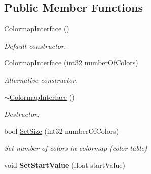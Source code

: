 \subsection*{Public Member Functions}
\begin{DoxyCompactItemize}
\item 
\hypertarget{classColormapInterface_a88621931bd86e21b18c9fb8901e52de2}{
\hyperlink{classColormapInterface_a88621931bd86e21b18c9fb8901e52de2}{ColormapInterface} ()}
\label{classColormapInterface_a88621931bd86e21b18c9fb8901e52de2}

\begin{DoxyCompactList}\small\item\em Default constructor. \end{DoxyCompactList}\item 
\hypertarget{classColormapInterface_abbaf26c369c77b8ce2f34e5f6e23e448}{
\hyperlink{classColormapInterface_abbaf26c369c77b8ce2f34e5f6e23e448}{ColormapInterface} (int32 numberOfColors)}
\label{classColormapInterface_abbaf26c369c77b8ce2f34e5f6e23e448}

\begin{DoxyCompactList}\small\item\em Alternative constructor. \end{DoxyCompactList}\item 
\hypertarget{classColormapInterface_ad21f99624caa4f23ca91c618424212f6}{
\hyperlink{classColormapInterface_ad21f99624caa4f23ca91c618424212f6}{$\sim$ColormapInterface} ()}
\label{classColormapInterface_ad21f99624caa4f23ca91c618424212f6}

\begin{DoxyCompactList}\small\item\em Destructor. \end{DoxyCompactList}\item 
\hypertarget{classColormapInterface_a292f9e7d4527205058dbf518783237f6}{
bool \hyperlink{classColormapInterface_a292f9e7d4527205058dbf518783237f6}{SetSize} (int32 numberOfColors)}
\label{classColormapInterface_a292f9e7d4527205058dbf518783237f6}

\begin{DoxyCompactList}\small\item\em Set number of colors in colormap (color table) \end{DoxyCompactList}\item 
\hypertarget{classColormapInterface_a568a705be78926a1c8cc1b459280341b}{
void {\bfseries SetStartValue} (float startValue)}
\label{classColormapInterface_a568a705be78926a1c8cc1b459280341b}


\end{DoxyCompactItemize}
